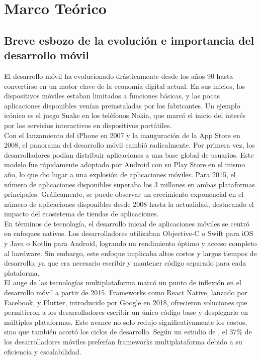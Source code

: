 \newpage
\section{Marco Teórico}

\subsection{Breve esbozo de la evolución e importancia del desarrollo móvil}
El desarrollo móvil ha evolucionado drásticamente desde los años 90 hasta convertirse en
un motor clave de la economía digital actual. En sus inicios, los dispositivos móviles estaban
limitados a funciones básicas, y las pocas aplicaciones disponibles venían preinstaladas por
los fabricantes. Un ejemplo icónico es el juego Snake en los teléfonos Nokia, que marcó el inicio
del interés por los servicios interactivos en dispositivos portátiles.\\

Con el lanzamiento del iPhone en 2007 y la inauguración de la App Store en 2008, el panorama del
desarrollo móvil cambió radicalmente. Por primera vez, los desarrolladores podían distribuir
aplicaciones a una base global de usuarios. Este modelo fue rápidamente adoptado por Android con
su Play Store en el mismo año, lo que dio lugar a una explosión de aplicaciones móviles.
Para 2015, el número de aplicaciones disponibles superaba los 3 millones en ambas plataformas
principales. Gráficamente, se puede observar un crecimiento exponencial en el número de
aplicaciones disponibles desde 2008 hasta la actualidad, destacando el impacto del ecosistema
de tiendas de aplicaciones.\\

En términos de tecnología, el desarrollo inicial de aplicaciones móviles se centró en enfoques
nativos. Los desarrolladores utilizaban Objective-C o Swift para iOS y Java o Kotlin para Android,
logrando un rendimiento óptimo y acceso completo al hardware. Sin embargo, este enfoque implicaba
altos costos y largos tiempos de desarrollo, ya que era necesario escribir y mantener código
separado para cada plataforma.\\

El auge de las tecnologías multiplataforma marcó un punto de inflexión en el desarrollo móvil
a partir de 2015. Frameworks como React Native, lanzado por Facebook, y Flutter, introducido por
Google en 2018, ofrecieron soluciones que permitieron a los desarrolladores escribir un único
código base y desplegarlo en múltiples plataformas. Este avance no solo redujo significativamente
los costos, sino que también acortó los ciclos de desarrollo. Según un estudio de \parencite{statista-hibrid-development}, el 37\% de
los desarrolladores móviles preferían frameworks multiplataforma debido a su
eficiencia y escalabilidad.\\

